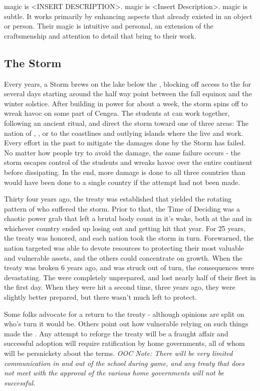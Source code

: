 \documentclass[blue]{GL2020}
\begin{document}
\pFarm{} magic is <INSERT DESCRIPTION>. \pTech{} magic is <Insert Description>. \pShip{} magic is subtle.  It works primarily by enhancing aspects that already existed in an object or person. Their magic is intuitive and personal, an extension of the craftsmenship and attention to detail that \pShippies{} bring to their work.

\subsection*{The Storm}
Every \pCycle{} years, a Storm brews on the lake below the \pSc{}, blocking off access to the \pSc{} for several days starting around the half way point between the fall equinox and the winter solstice. After building in power for about a week, the storm spins off to wreak havoc on some part of Cengea. The students at \pSchool{} can work together, following an ancient ritual, and direct the storm toward one of three areas: The nation of \pFarm{}, \pTech{}, or to the coastlines and outlying islands where the \pShippies{} live and work. Every effort in the past to mitigate the damages done by the Storm has failed. No matter how people try to avoid the damage, the same failure occurs - the storm escapes control of the students and wreaks havoc over the entire continent before dissipating. In the end, more damage is done to all three countries than would have been done to a single country if the attempt had not been made. 

Thirty four years ago, the treaty was established that yielded the rotating pattern of who suffered the storm. Prior to that, the Time of Deciding was a chaotic power grab that left a brutal body count in it's wake, both at the \pSchool{} and in whichever country ended up losing out and getting hit that year. For 25 years, the treaty was honored, and each nation took the storm in turn. Forewarned, the nation targeted was able to devote resources to protecting their most valuable and vulnerable assets, and the others could concentrate on growth. When the treaty was broken 6 years ago, and \pShip{} was struck out of turn, the consequences were devastating. The \pShippies{} were completely unprepared, and lost nearly half of their fleet in the first day. When they were hit a second time, three years ago, they were slightly better prepared, but there wasn't much left to protect.

Some folks advocate for a return to the treaty - although opinions are split on who's turn it would be. Others point out how vulnerable relying on such things made the \pShip{}. Any attempt to reforge the treaty will be a fraught affair and successful adoption will require ratification by home governments, all of whom will be persnickety about the terms. \emph{OOC Note: There will be very limited communication in and out of the school during game, and any treaty that does not meet with the approval of the various home governments will not be successful.}
\end{document}
